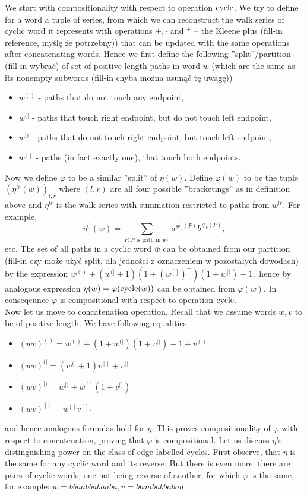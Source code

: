 	We start with compositionality with respect to operation $\operatorname{cycle}$. We try to define for a word a tuple of series, from which we can reconstruct the walk series of cyclic word it represents with operations $+, \cdot$ and $^+$ -- the Kleene plus (fill-in reference, myślę że potrzebny)) that can be updated with the same operations after concatenating words. Hence we first define the following ''split''/partition (fill-in wybrać) of set of positive-length paths in word $w$ (which are the same as its nonempty subwords (fill-in chyba można usunąć tę uwagę)) 	
 \begin{itemize}
 	\item $w^{()}$ - paths that do not touch any endpoint,
 	\item $w^{(]}$ - paths that touch right endpoint, but do not touch left endpoint,
 	\item $w^{[)}$ - paths that do not touch right endpoint, but touch left endpoint,
 	\item $w^{[]}$ - paths (in fact exactly one), that touch both endpoints.
 \end{itemize}
Now we define $\varphi$ to be a similar ''split'' of $\eta(w)$. Define
$
\varphi(w)$ to be the tuple $(\eta^{lr}(w))_{l,r}
$
where $(l,r)$ are all four possible ''bracketings'' as in definition above and $\eta^{lr}$ is the walk series with summation restricted to paths from $w^{lr}$. 
For example,
$$
\eta^{(]}(w) = \sum_{P: P \text{ is path in } w^{(]}}a^{\#_a(P)}b^{\#_b(P)},
$$
etc. The set of all paths in a cyclic word $\overline{w}$ can be obtained from our partition (fill-in czy może użyć split, dla jedności z oznaczeniem w pozostałych dowodach) by the expression
$
w^{()} + (w^{(]} + 1)(1 + (w^{[]})^+)(1 + w^{[)}) - 1,
$
hence by analogous expression $\eta(w) = \varphi(\operatorname{cycle}(w))$ can be obtained from $\varphi(w)$. In conseqeunce $\varphi$ is compositional with respect to operation $\operatorname{cycle}$.\\
Now let us move to concatenation operation.
Recall that we assume words $w,v$ to be of positive length.
We have following equalities
\begin{itemize}
	\item $(wv)^{()} = w^{()} + (1+w^{(]})(1 + v^{[)}) - 1 + v^{()}$ 
	\item $(wv)^{(]} = (w^{(]}+1)v^{[]} + v^{(]}$
	\item $(wv)^{[)} = w^{[)} + w^{[]}(1 + v^{[)})$
	\item $(wv)^{[]} = w^{[]}v^{[]}$.
\end{itemize}
and hence analogous formulas hold for $\eta$. This proves compositionality of $\varphi$ with respect to concatenation, proving that $\varphi$ is compositional.
\fi
Let us discuss $\eta$'s distinguishing power on the class of edge-labelled cycles. First observe, that $\eta$ is the same for any cyclic word and its reverse. But there is even more: there are pairs of cyclic words, one not being reverse of another, for which $\varphi$ is the same, for example:
$
w = bbaabbabaaba,
v = bbaababbabaa.
$

